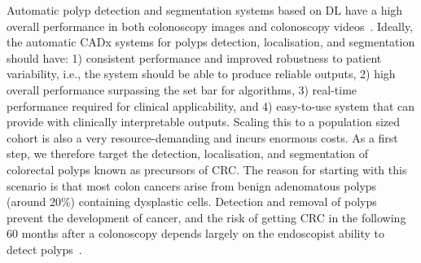 \documentclass[journal]{IEEEtran}
\begin{document}
Automatic polyp detection and segmentation systems based on \ac{DL} have a high overall performance in both colonoscopy images and colonoscopy videos~\cite{lee2020real,wang2018development}. Ideally, the automatic \ac{CADx} systems for polyps detection, localisation, and segmentation should have: 1) consistent performance and improved robustness to patient variability, i.e., the system should be able to produce reliable outputs, 2) high overall performance surpassing the set bar for algorithms, 3) real-time performance required for clinical applicability, and 4) easy-to-use system that can provide with clinically interpretable outputs. Scaling this to a population sized cohort is also a very resource-demanding and incurs enormous costs. As a first step, we therefore target the detection, localisation, and segmentation of colorectal polyps known as precursors of \ac{CRC}. The reason for starting with this scenario is that most colon cancers arise from benign adenomatous polyps (around 20\%) containing dysplastic cells. Detection and removal of polyps prevent the development of cancer, and the risk of getting \ac{CRC} in the following 60 months after a colonoscopy depends largely on the endoscopist ability to detect polyps~\cite{kaminski2010quality}. 
\end{document}
